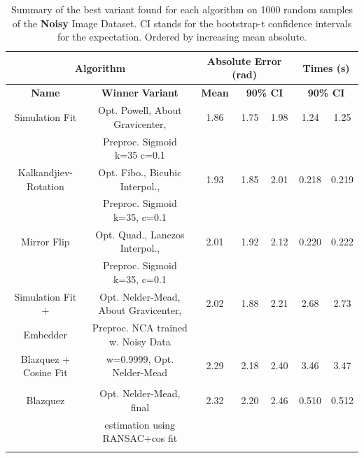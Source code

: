 \documentclass[11pt, a4paper, twoside]{article} %
\begin{document}
\begin{table}[h!]
\caption{Summary of the best variant found for each algorithm on 1000 random samples of the {\bf Noisy} Image Dataset. CI stands for the bootstrap-t confidence intervals \cite{boots} for the expectation. Ordered by increasing mean absolute.\vspace{-0.4cm}}\label{tab:noisy}
{\small 
\center \begin{tabular}{c|c|c|cc|cc}
\toprule
 \multicolumn{2}{c|}{\bf Algorithm} &  \multicolumn{3}{|c|}{\bf Absolute Error (rad)} & \multicolumn{2}{|c}{\bf Times (s)} \\ \midrule \midrule
{\bf                     Name} &                          {\bf Winner} {\bf Variant} &  {\bf Mean} &  \multicolumn{2}{c|}{\bf 90\% CI } &  \multicolumn{2}{|c}{\bf 90\% CI }\\
\bottomrule\rule{0pt}{4mm}{}
           Simulation Fit &         Opt. Powell, About Gravicenter, &  1.86 &       1.75 &      1.98 &         1.24 &        1.25 \\
                          &             Preproc. Sigmoid k=35 c=0.1 &       &            &           &              &             \\ \hline\rule{0pt}{4mm}{}Kalkandjiev-Rotation &         Opt. Fibo., Bicubic Interpol.,  &  1.93 &       1.85 &      2.01 &         0.218 &        0.219 \\
                          &            Preproc. Sigmoid k=35, c=0.1 &       &            &           &              &             \\ \hline
              \rule{0pt}{4mm}{}Mirror Flip &         Opt. Quad., Lanczos Interpol.,  &  2.01 &       1.92 &      2.12 &         0.220 &        0.222 \\
                          &            Preproc. Sigmoid k=35, c=0.1 &       &            &           &              &             \\ \hline
\rule{0pt}{4mm}{}Simulation Fit + &   Opt. Nelder-Mead, About Gravicenter,  &  2.02 &       1.88 &      2.21 &         2.68 &        2.73 \\
                         Embedder  &      Preproc. NCA trained w. Noisy Data &       &            &           &              &             \\ \hline
    \rule{0pt}{4mm}{}Blazquez + Cosine Fit &              w=0.9999, Opt. Nelder-Mead &  2.29 &       2.18 &      2.40 &         3.46 &        3.47 \\
                          &                                         &       &            &           &              &             \\ \hline
                 \rule{0pt}{4mm}{}Blazquez &                Opt. Nelder-Mead, final  &  2.32 &       2.20 &      2.46 &         0.510 &        0.512 \\ 
                          &         estimation using RANSAC+cos fit &       &            &           &              &             \\ \hline
           \rule{0pt}{4mm}{}                    
           

\end{tabular}}
\end{table}
\end{document}
